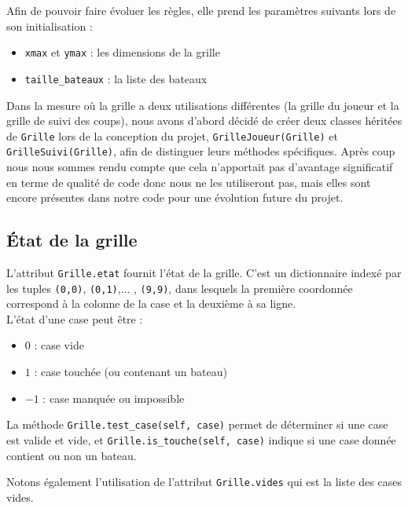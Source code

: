 Afin de pouvoir faire évoluer les règles, elle prend les paramètres suivants lors de son initialisation :
\begin{itemize}
\item \texttt{xmax} et \texttt{ymax} : les dimensions de la grille
\item \texttt{taille\_bateaux} : la liste des bateaux
\end{itemize}
\medskip

Dans la mesure où la grille a deux utilisations différentes (la grille du joueur et la grille de suivi des coups), nous avons d'abord décidé de créer deux classes héritées de \texttt{Grille} lors de la conception du projet, \texttt{GrilleJoueur(Grille)} et \texttt{GrilleSuivi(Grille)}, afin de distinguer leurs méthodes spécifiques. Après coup nous nous sommes rendu compte que cela n'apportait pas d'avantage significatif en terme de qualité de code donc nous ne les utiliseront pas, mais elles sont encore présentes dans notre code pour une évolution future du projet.

\subsection{État de la grille}

L'attribut \texttt{Grille.etat} fournit l'état de la grille. C'est un dictionnaire indexé par les tuples \texttt{(0,0)}, \texttt{(0,1)},... , \texttt{(9,9)}, dans lesquels la première coordonnée correspond à la colonne de la case et la deuxième à sa ligne.\\
L'état d'une case peut être :
\begin{itemize}
\item $0$ : case vide
\item $1$ : case touchée (ou contenant un bateau)
\item $-1$ : case manquée ou impossible
\end{itemize}

\medskip

La méthode \texttt{Grille.test\_case(self, case)} permet de déterminer si une case est valide et vide, et \texttt{Grille.is\_touche(self, case)} indique si une case donnée contient ou non un bateau.

\medskip

Notons également l'utilisation de l'attribut \texttt{Grille.vides} qui est la liste des cases vides.

